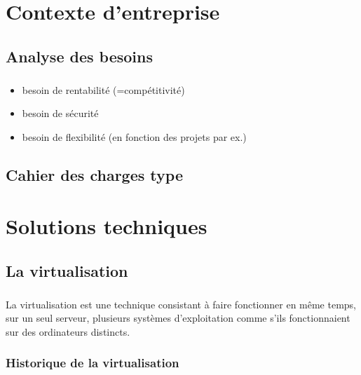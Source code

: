 \documentclass[a4paper,12pt]{report}
\begin{document}
\begin{onehalfspace}
	\chapter{Contexte d’entreprise}
	
	\section{Analyse des besoins}
	

	\paragraph*{}
	\begin{itemize}
		\item besoin de rentabilité (=compétitivité)
		\item besoin de sécurité
		\item besoin de flexibilité (en fonction des projets par ex.)
	\end{itemize}

	\section{Cahier des charges type}
	


	\chapter{Solutions techniques}
	
	\section{La virtualisation}
	
	\paragraph*{}
	La virtualisation est une technique consistant à faire fonctionner en même temps, sur un seul serveur, plusieurs systèmes d'exploitation comme s'ils fonctionnaient sur des ordinateurs distincts.
	
	\subsection{Historique de la virtualisation}
	

\end{onehalfspace}
\end{document}
